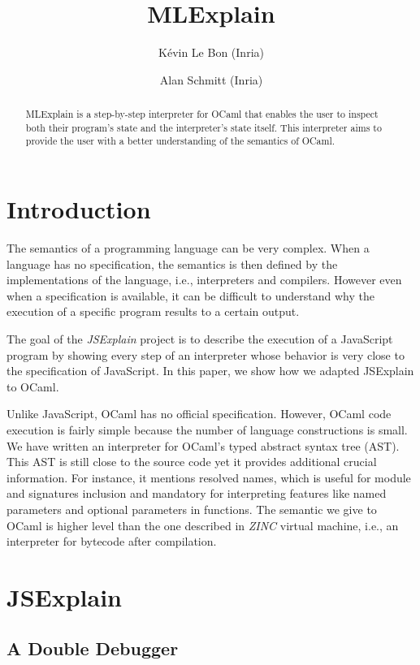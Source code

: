 \documentclass[twocolumn,a4paper]{article}
\author{ K\'evin Le Bon (Inria) \and Alan Schmitt (Inria) }
\title{MLExplain}
\date{}
\begin{document}
\maketitle

\begin{abstract}
  MLExplain is a step-by-step interpreter for OCaml that enables the
  user to inspect both their program's state and the interpreter's state
  itself. This interpreter aims to provide the user with a better understanding
  of the semantics of OCaml.
\end{abstract}

\section{Introduction}

The semantics of a programming language can be very complex. When a language
has no specification, the semantics is then defined by the implementations of
the language, i.e., interpreters and compilers. However even when a
specification is available, it can be difficult to understand why the execution
of a specific program results to a certain output.

The goal of the \emph{JSExplain} project \cite{chargueraud:hal-01745792} is to
describe the execution of a JavaScript program by showing every step of an
interpreter whose behavior is very close to the specification of JavaScript. In
this paper, we show how we adapted JSExplain to OCaml.

Unlike JavaScript, OCaml has no official specification. However, OCaml code
execution is fairly simple because the number of language constructions is
small. We have written an interpreter for OCaml's typed abstract syntax tree
(AST). This AST is still close to the source code yet it provides additional
crucial information. For instance, it mentions resolved names, which is useful
for module and signatures inclusion and mandatory for interpreting features like
named parameters and optional parameters in functions. The semantic we give to
OCaml is higher level than the one described in \emph{ZINC} \cite{Leroy-ZINC}
virtual machine, i.e., an interpreter for bytecode after compilation.

\section{JSExplain}

\subsection{A Double Debugger}
\label{subsec:double-debugger}
\end{document}
